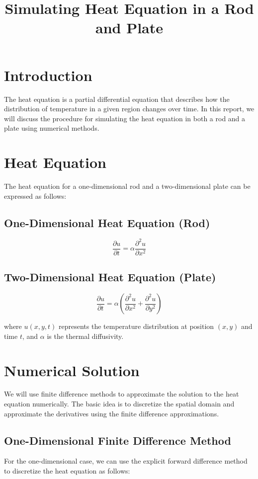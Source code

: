 \documentclass{article}
\title{Simulating Heat Equation in a Rod and Plate}
\begin{document}
\maketitle

\section{Introduction}
The heat equation is a partial differential equation that describes how the distribution of temperature in a given region changes over time. In this report, we will discuss the procedure for simulating the heat equation in both a rod and a plate using numerical methods.

\section{Heat Equation}
The heat equation for a one-dimensional rod and a two-dimensional plate can be expressed as follows:

\subsection{One-Dimensional Heat Equation (Rod)}
\begin{equation}
    \frac{\partial u}{\partial t} = \alpha \frac{\partial^2 u}{\partial x^2}
\end{equation}

\subsection{Two-Dimensional Heat Equation (Plate)}
\begin{equation}
    \frac{\partial u}{\partial t} = \alpha \left( \frac{\partial^2 u}{\partial x^2} + \frac{\partial^2 u}{\partial y^2} \right)
\end{equation}

where $u(x, y, t)$ represents the temperature distribution at position $(x, y)$ and time $t$, and $\alpha$ is the thermal diffusivity.

\section{Numerical Solution}
We will use finite difference methods to approximate the solution to the heat equation numerically. The basic idea is to discretize the spatial domain and approximate the derivatives using the finite difference approximations.

\subsection{One-Dimensional Finite Difference Method}
For the one-dimensional case, we can use the explicit forward difference method to discretize the heat equation as follows:
\end{document}
